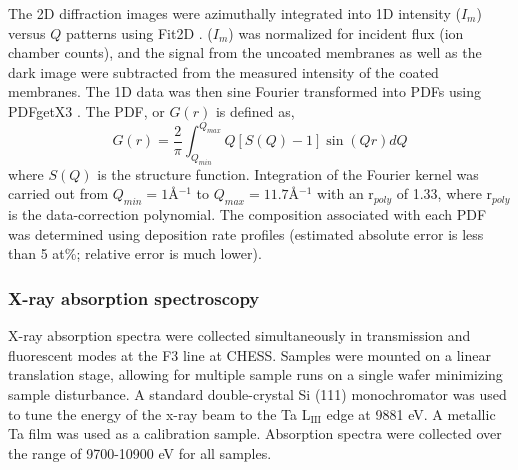 The 2D diffraction images were azimuthally integrated into 1D intensity ($I_{m}$) versus $Q$ patterns using Fit2D \cite{Hammersley1996, Hammersley1998}. ($I_{m}$) was normalized for incident flux (ion chamber counts), and the signal from the uncoated membranes as well as the dark image were subtracted from the measured intensity of the coated membranes. The 1D data was then sine Fourier transformed into PDFs using PDFgetX3 \cite{Juhas2013a}. The PDF, or $G(r)$ is defined as,  
\begin{equation}
G(r) = \frac{2}{\pi} \int_{Q_{min}}^{Q_{max}} Q[S(Q)-1]\sin{(Qr)}dQ
\label{eq:sinetransform}
\end{equation}
\noindent where $S(Q)$ is the structure function. Integration of the Fourier kernel was carried out from $Q_{min} = 1$\;\AA$^{-1}$ to $Q_{max} = 11.7$\;\AA$^{-1}$ with an r$_{poly}$ of 1.33, where r$_{poly}$ is the data-correction polynomial. The composition associated with each PDF was determined using deposition rate profiles (estimated absolute error is less than 5 at\%; relative error is much lower).

\subsubsection{X-ray absorption spectroscopy} 

X-ray absorption spectra were collected simultaneously in transmission and fluorescent modes at the F3 line at CHESS. Samples were mounted on a linear translation stage, allowing for multiple sample runs on a single wafer minimizing sample disturbance. A standard double-crystal Si (111) monochromator was used to tune the energy of the x-ray beam to the Ta L$_{\text{III}}$ edge at 9881 eV. A metallic Ta film was used as a calibration sample. Absorption spectra were collected over the range of 9700-10900 eV for all samples.


